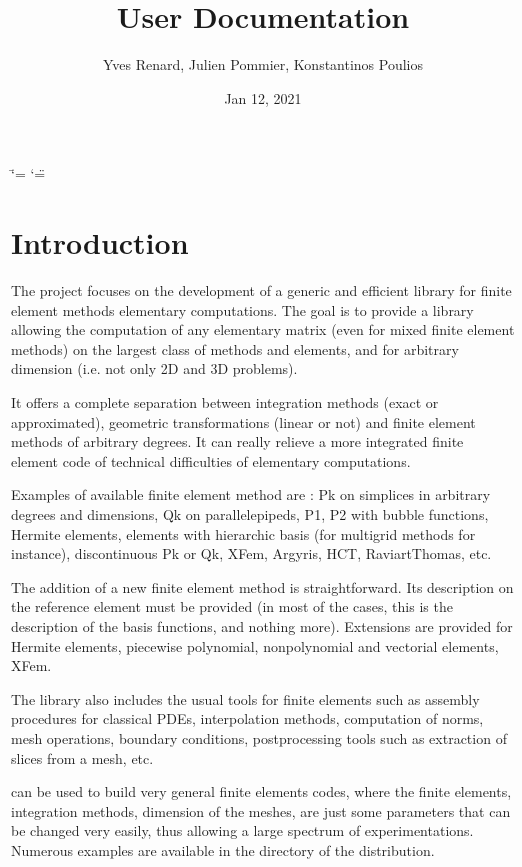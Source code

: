 \documentclass[a4paper,11pt,english]{sphinxmanual}
\title{User Documentation}
\date{Jan 12, 2021}
\author{Yves Renard, Julien Pommier, Konstantinos Poulios}
\begin{document}
\ifdefined\shorthandoff
  \ifnum\catcode`\=\string=\active\shorthandoff{=}\fi
  \ifnum\catcode`\"=\active{}\fi
\fi

\pagestyle{empty}
\sphinxmaketitle
\pagestyle{plain}
\sphinxtableofcontents
\pagestyle{normal}
\label{\detokenize{userdoc/index::doc}}



\chapter{Introduction}
\label{\detokenize{userdoc/intro:introduction}}\label{\detokenize{userdoc/intro:ud-intro}}\label{\detokenize{userdoc/intro::doc}}
The  project focuses on the development of a generic and
efficient  library for finite element methods elementary
computations. The goal is to provide a library allowing the
computation of any elementary matrix (even for mixed finite element
methods) on the largest class of methods and elements, and for
arbitrary dimension (i.e. not only 2D and 3D problems).

It offers a complete separation between integration methods (exact or
approximated), geometric transformations (linear or not) and finite
element methods of arbitrary degrees. It can really relieve a more
integrated finite element code of technical difficulties of
elementary computations.

Examples of available finite element method are : Pk on simplices in
arbitrary degrees and dimensions, Qk on parallelepipeds, P1, P2 with
bubble functions, Hermite elements, elements with hierarchic basis
(for multigrid methods for instance), discontinuous Pk or Qk, XFem,
Argyris, HCT, Raviart\sphinxhyphen{}Thomas, etc.

The addition of a new finite element method is straightforward. Its
description on the reference element must be provided (in most of the
cases, this is the description of the basis functions, and nothing
more). Extensions are provided for Hermite elements, piecewise
polynomial, non\sphinxhyphen{}polynomial and vectorial elements, XFem.

The library also includes the usual tools for finite elements such as
assembly procedures for classical PDEs, interpolation methods,
computation of norms, mesh operations, boundary conditions,
post\sphinxhyphen{}processing tools such as extraction of slices from a mesh, etc.

 can be used to build very general finite elements codes, where
the finite elements, integration methods, dimension of the meshes,
are just some parameters that can be changed very easily, thus
allowing a large spectrum of experimentations. Numerous examples are
available in the  directory of the distribution.
\end{document}
